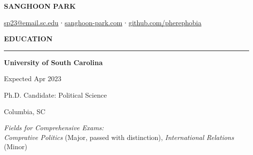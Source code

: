 \documentclass[
  16,
]{article}
\author{}
\date{}
\begin{document}
\ifdefined\Shaded\renewenvironment{Shaded}{\begin{tcolorbox}[interior hidden, boxrule=0pt, borderline west={3pt}{0pt}{shadecolor}, frame hidden, enhanced, sharp corners, breakable]}{\end{tcolorbox}}\fi

\begin{huge}\begin{center}{\bf SANGHOON PARK}\end{center}\end{huge}

\begin{center}
{\faEnvelope}\href{sp23@email.sc.edu}{\ttfamily sp23@email.sc.edu} ∙
{\faLink} \href{sanghoon-park.com}{\ttfamily sanghoon-park.com} ∙ 
{\faGithub} \href{https://github.com/pherephobia}{\ttfamily github.com/pherephobia}
\end{center}
\vspace{15pt}

\vspace{3pt}
\begin{large}
 {\bf EDUCATION}
  \vspace{3pt}
  \hrule
  \begin{multicols}{2}
    \begin{flushleft}{\bf University of South Carolina}\end{flushleft}
    \begin{flushright}Expected Apr 2023\end{flushright}
  \end{multicols}
  \vspace{-0.17cm}
  \begin{multicols}{2}
    \begin{flushleft}Ph.D. Candidate: Political Science\end{flushleft}
    \begin{flushright}Columbia, SC\end{flushright}
  \end{multicols}
  \vspace{-0.25cm}
  \hspace{3pt}\textit{Fields for Comprehensive Exams:}\\
  \vspace{-0.25cm}
  \hspace{6pt}\textit{Comprative Politics} (Major, passed with distinction), \textit{International Relations} (Minor)
\end{large}
\vspace{3pt}
\end{document}

